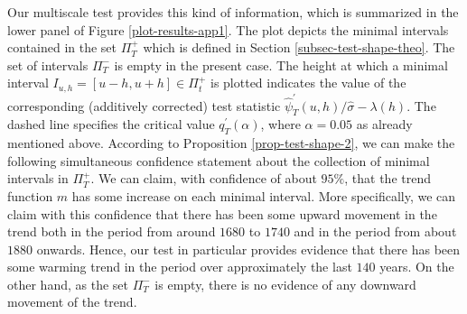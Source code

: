 \documentclass[a4paper,12pt]{article}
\begin{document}
Our multiscale test provides this kind of information, which is summarized in the lower panel of Figure \ref{plot-results-app1}. The plot depicts the minimal intervals contained in the set $\Pi_T^+$ which is defined in Section \ref{subsec-test-shape-theo}. The set of intervals $\Pi_T^-$ is empty in the present case. The height at which a minimal interval $I_{u,h} = [u-h,u+h] \in \Pi_t^+$ is plotted indicates the value of the corresponding (additively corrected) test statistic $\widehat{\psi}^\prime_T(u,h) / \widehat{\sigma} - \lambda(h)$. The dashed line specifies the critical value $q_T^\prime(\alpha)$, where $\alpha = 0.05$ as already mentioned above. According to Proposition \ref{prop-test-shape-2}, we can make the following simultaneous confidence statement about the collection of minimal intervals in $\Pi_T^+$. We can claim, with confidence of about $95\%$, that the trend function $m$ has some increase on each minimal interval. More specifically, we can claim with this confidence that there has been some upward movement in the trend both in the period from around $1680$ to $1740$ and in the period from about $1880$ onwards. Hence, our test in particular provides evidence that there has been some warming trend in the period over approximately the last $140$ years. On the other hand, as the set $\Pi_T^-$ is empty, there is no evidence of any downward movement of the trend.  


{\small
\setlength{\bibsep}{0.55em}
}
\end{document}
